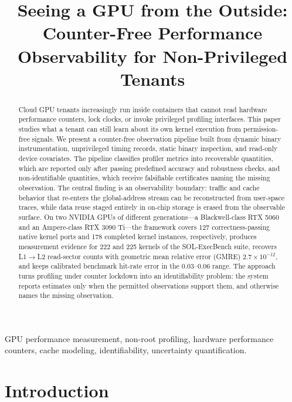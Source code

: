 \documentclass[conference]{IEEEtran}
\begin{document}
\title{Seeing a GPU from the Outside:\\
Counter-Free Performance Observability for Non-Privileged Tenants}

\author{}

\maketitle

\begin{abstract}
Cloud GPU tenants increasingly run inside containers that cannot read hardware
performance counters, lock clocks, or invoke privileged profiling interfaces.
This paper studies what a tenant can still learn about its own kernel
execution from permission-free signals. We present a counter-free observation
pipeline built from dynamic binary instrumentation, unprivileged timing
records, static binary inspection, and read-only device covariates. The
pipeline classifies profiler metrics into recoverable quantities, which are
reported only after passing predefined accuracy and robustness checks, and
non-identifiable quantities, which receive falsifiable certificates naming the
missing observation. The central finding is an observability boundary: traffic and
cache behavior that re-enters the global-address stream can be reconstructed
from user-space traces, while data reuse staged entirely in on-chip storage is
erased from the observable surface. On two NVIDIA GPUs of different
generations---a Blackwell-class RTX 5060 and an Ampere-class RTX 3090 Ti---the
framework covers 127 correctness-passing native kernel ports and 178 completed
kernel instances, respectively, produces measurement evidence for 222 and 225
kernels of the SOL-ExecBench suite, recovers L1$\rightarrow$L2 read-sector
counts with geometric mean relative error (GMRE) $2.7{\times}10^{-12}$, and
keeps calibrated benchmark hit-rate error in the $0.03$--$0.06$ range. The
approach turns profiling under counter lockdown into an identifiability
problem: the system reports estimates only when the permitted observations
support them, and otherwise names the missing observation.
\end{abstract}

\begin{IEEEkeywords}
GPU performance measurement, non-root profiling, hardware performance counters,
cache modeling, identifiability, uncertainty quantification.
\end{IEEEkeywords}

\section{Introduction}
\end{document}
